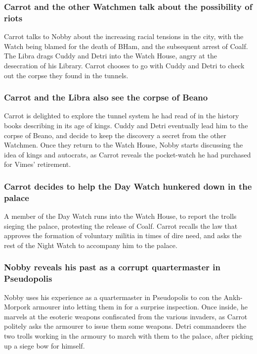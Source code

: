 \subsubsection{\Gls{Carrot} and the other Watchmen talk about the possibility of riots}
\Gls{Carrot} talks to \Gls{Nobby} about the increasing racial tensions in the city, with the Watch
being blamed for the death of \Gls{BHam}, and the subsequent arrest of \Gls{Coalf}. The \Gls{Libra}
drags \Gls{Cuddy} and \Gls{Detri} into the Watch House, angry at the desecration of his Library.
\Gls{Carrot} chooses to go with \Gls{Cuddy} and \Gls{Detri} to check out the corpse they found in
the tunnels.

\subsubsection{\Gls{Carrot} and the \Gls{Libra} also see the corpse of \Gls{Beano}}
\Gls{Carrot} is delighted to explore the tunnel system he had read of in the history books
describing in its age of kings. \Gls{Cuddy} and \Gls{Detri} eventually lead him to the corpse of
\Gls{Beano}, and decide to keep the discovery a secret from the other Watchmen. Once they return to
the Watch House, \Gls{Nobby} starts discussing the idea of kings and autocrats, as \Gls{Carrot}
reveals the pocket-watch he had purchased for \Gls{Vimes}' retirement.

\subsubsection{\Gls{Carrot} decides to help the Day Watch hunkered down in the palace}
A member of the Day Watch runs into the Watch House, to report the trolls sieging the palace,
protesting the release of \Gls{Coalf}. \Gls{Carrot} recalls the law that approves the formation of
voluntary militia in times of dire need, and asks the rest of the Night Watch to accompany him to
the palace.

\subsubsection{\Gls{Nobby} reveals his past as a corrupt quartermaster in Pseudopolis}
\Gls{Nobby} uses his experience as a quartermaster in Pseudopolis to con the Ankh-Morpork armourer
into letting them in for a surprise inspection. Once inside, he marvels at the esoteric weapons
confiscated from the various invaders, as \Gls{Carrot} politely asks the armourer to issue them some
weapons. \Gls{Detri} commandeers the two trolls working in the armoury to march with them to the
palace, after picking up a siege bow for himself.

